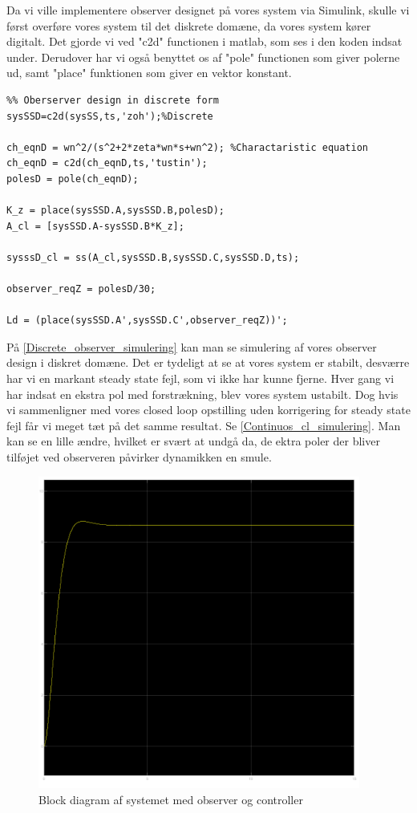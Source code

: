 Da vi ville implementere observer designet på vores system via Simulink, skulle vi først overføre vores system til det diskrete domæne, da vores system kører digitalt. Det gjorde vi ved "c2d" functionen i matlab, som ses i den koden indsat under. Derudover har vi også benyttet os af "pole" functionen som giver polerne ud, samt "place" funktionen som giver en vektor konstant.

\begin{lstlisting}
%% Oberserver design in discrete form
sysSSD=c2d(sysSS,ts,'zoh');%Discrete

ch_eqnD = wn^2/(s^2+2*zeta*wn*s+wn^2); %Charactaristic equation
ch_eqnD = c2d(ch_eqnD,ts,'tustin');
polesD = pole(ch_eqnD);

K_z = place(sysSSD.A,sysSSD.B,polesD);
A_cl = [sysSSD.A-sysSSD.B*K_z];

sysssD_cl = ss(A_cl,sysSSD.B,sysSSD.C,sysSSD.D,ts);

observer_reqZ = polesD/30;

Ld = (place(sysSSD.A',sysSSD.C',observer_reqZ))';
\end{lstlisting}


På \autoref{Discrete_observer_simulering} kan man se simulering af vores observer design i diskret domæne. Det er tydeligt at se at vores system er stabilt, desværre har vi en markant steady state fejl, som vi ikke har kunne fjerne. Hver gang vi har indsat en ekstra pol med forstrækning, blev vores system ustabilt. Dog hvis vi sammenligner med vores closed loop opstilling uden korrigering for steady state fejl får vi meget tæt på det samme resultat. Se \autoref{Continuos_cl_simulering}. Man kan se en lille ændre, hvilket er svært at undgå da, de ektra poler der bliver tilføjet ved observeren påvirker dynamikken en smule.


\begin{figure}[H]
	\centering
	\includegraphics[width = 300pt]{Img/Discrete_observer_simulering.png}
	\caption{Block diagram af systemet med observer og controller}
	\label{Discrete_observer_simulering}
\end{figure}


